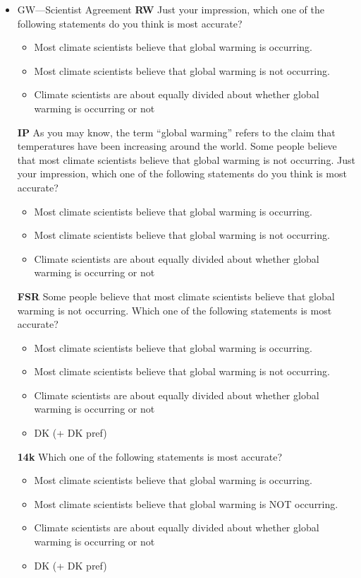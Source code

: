 \begin{itemize}
\item GW—Scientist Agreement\newline
\textbf{RW}\newline
Just your impression, which one of the following statements do you think is most
accurate?
\begin{itemize}
	\item Most climate scientists believe that global warming is occurring.
	\item Most climate scientists believe that global warming is not occurring.
	\item Climate scientists are about equally divided about whether global warming is occurring or not
\end{itemize}

\textbf{IP}\newline
As you may know, the term ``global warming'' refers to the claim that temperatures
have been increasing around the world. Some people believe that most climate
scientists believe that global warming is not occurring. Just your impression, which
one of the following statements do you think is most accurate?
\begin{itemize}
	\item Most climate scientists believe that global warming is occurring.
	\item Most climate scientists believe that global warming is not occurring.
	\item Climate scientists are about equally divided about whether global warming is occurring or not
\end{itemize}
\textbf{FSR}\newline
Some people believe that most climate scientists believe that global warming is not
occurring. Which one of the following statements is most accurate?
\begin{itemize}
	\item Most climate scientists believe that global warming is occurring.
	\item Most climate scientists believe that global warming is not occurring.
	\item Climate scientists are about equally divided about whether global warming is occurring or not
	\item DK (+ DK pref)
\end{itemize}

\textbf{14k}\newline
Which one of the following statements is most accurate?
\begin{itemize}
	\item Most climate scientists believe that global warming is occurring.
	\item Most climate scientists believe that global warming is NOT occurring.
	\item Climate scientists are about equally divided about whether global warming is occurring or not
	\item DK (+ DK pref)
\end{itemize}


\end{itemize}
